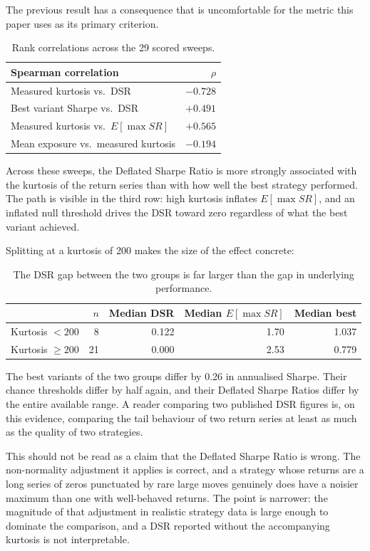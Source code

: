 \documentclass[11pt,a4paper]{article}
\begin{document}
The previous result has a consequence that is uncomfortable for the metric
this paper uses as its primary criterion.

\begin{table}[ht]
\centering
\small
\begin{tabular}{lr}
\toprule
Spearman correlation & $\rho$ \\
\midrule
Measured kurtosis vs.\ DSR & $-0.728$ \\
Best variant Sharpe vs.\ DSR & $+0.491$ \\
Measured kurtosis vs.\ $E[\max SR]$ & $+0.565$ \\
Mean exposure vs.\ measured kurtosis & $-0.194$ \\
\bottomrule
\end{tabular}
\caption{Rank correlations across the 29 scored sweeps.}
\end{table}

Across these sweeps, the Deflated Sharpe Ratio is more strongly associated
with the kurtosis of the return series than with how well the best strategy
performed. The path is visible in the third row: high kurtosis inflates
$E[\max SR]$, and an inflated null threshold drives the DSR toward zero
regardless of what the best variant achieved.

Splitting at a kurtosis of 200 makes the size of the effect concrete:

\begin{table}[ht]
\centering
\small
\begin{tabular}{lrrrr}
\toprule
& $n$ & Median DSR & Median $E[\max SR]$ & Median best \\
\midrule
Kurtosis $< 200$ & 8 & 0.122 & 1.70 & 1.037 \\
Kurtosis $\geq 200$ & 21 & 0.000 & 2.53 & 0.779 \\
\bottomrule
\end{tabular}
\caption{The DSR gap between the two groups is far larger than the gap in
underlying performance.}
\end{table}

The best variants of the two groups differ by 0.26 in annualised Sharpe. Their
chance thresholds differ by half again, and their Deflated
Sharpe Ratios differ by the entire available range. A reader comparing two
published DSR figures is, on this evidence, comparing the tail behaviour of
two return series at least as much as the quality of two strategies.

This should not be read as a claim that the Deflated Sharpe Ratio is wrong.
The non-normality adjustment it applies is correct, and a strategy whose
returns are a long series of zeros punctuated by rare large moves genuinely
does have a noisier maximum than one with well-behaved returns. The point is
narrower: the magnitude of that adjustment in realistic strategy data is large
enough to dominate the comparison, and a DSR reported without the
accompanying kurtosis is not interpretable.
\end{document}
